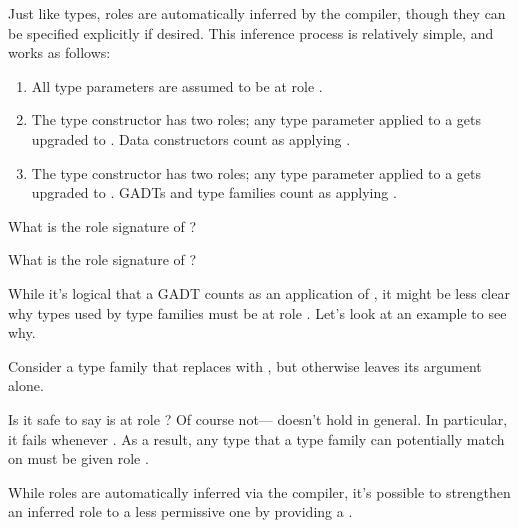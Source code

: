 \documentclass[book.tex]{subfiles}
\begin{document}
Just like types, roles are automatically inferred by the compiler, though they
can be specified explicitly if desired. This inference process is relatively
simple, and works as follows:

\begin{enumerate}
  \item{All type parameters are assumed to be at role .}
  \item{The type constructor \ty{(->)} has two  roles; any
    type parameter applied to a \ty{(->)} gets upgraded to
    . Data constructors count as applying \ty{(->)}.}
  \item{The type constructor \ty{(\tyeq)} has two  roles; any
    type parameter applied to a \ty{(\tyeq)} gets upgraded to .
    GADTs and type families count as applying \ty{(\tyeq)}.}
\end{enumerate}

\begin{exercise}
  What is the role signature of ?
\end{exercise}
\begin{solution}
\end{solution}

\begin{exercise}
  What is the role signature of ?
\end{exercise}
\begin{solution}
\end{solution}

While it's logical that a GADT counts as an application of \ty{(\tyeq)}, it
might be less clear why types used by type families must be at role
. Let's look at an example to see why.

Consider a type family that replaces  with , but otherwise
leaves its argument alone.


Is it safe to say  is at role ? Of course
not--- doesn't hold
in general. In particular, it fails whenever . As a result, any
type that a type family can potentially match on must be given role
.

While roles are automatically inferred via the compiler, it's possible to
strengthen an inferred role to a less permissive one by providing a .
\end{document}

